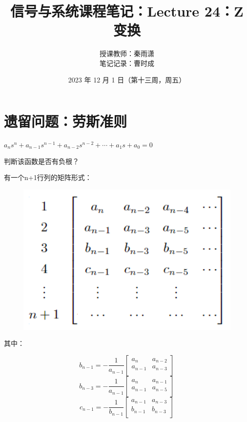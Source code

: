 \documentclass[UTF8]{ctexart}
\begin{document}
\title{信号与系统课程笔记：Lecture 24：Z变换}
\author{授课教师：秦雨潇 \\
        笔记记录：曹时成}
\date{2023 年 12 月 1 日（第十三周，周五）}
\maketitle

\section{遗留问题：劳斯准则}
\qquad $a_ns^n+a_{n-1}s^{n-1}+a_{n-2}s^{n-2}+\cdots +a_{1}s+a_0=0$\par
判断该函数是否有负根？\par
有一个n+1行列的矩阵形式：\par
\begin{figure}[h]
    \centering         %
    \includegraphics[scale=0.5]{1.png}
\end{figure}
其中：\par
\[b_{n-1}=-\frac{1}{a_{n-1}} \left[   
    \begin{matrix}
    a_{n} & a_{n-2} \\
    a_{n-1} & a_{n-3} \\
    \end{matrix}
     \right]  \]
\[b_{n-3}=-\frac{1}{a_{n-1}} \left[   
        \begin{matrix}
        a_{n} & a_{n-1} \\
        a_{n-1} & a_{n-5} \\
        \end{matrix}
         \right]  \]
\[c_{n-1}=-\frac{1}{b_{n-1}} \left[   
            \begin{matrix}
            a_{n-1} & a_{n-3} \\
            b_{n-1} & b_{n-3} \\
            \end{matrix}
             \right]  \]
\end{document}
